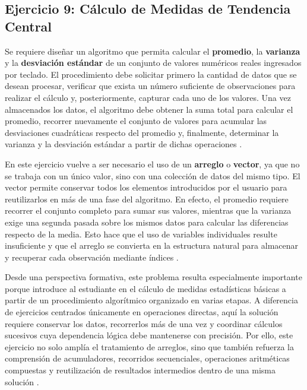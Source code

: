 \documentclass[12pt,twoside]{book}
\begin{document}
			\subsection{Ejercicio 9: Cálculo de Medidas de Tendencia Central}
			\noindent
				Se requiere diseñar un algoritmo que permita calcular el \textbf{promedio}, la \textbf{varianza} y la \textbf{desviación estándar} de un conjunto de valores numéricos reales ingresados por teclado. El procedimiento debe solicitar primero la cantidad de datos que se desean procesar, verificar que exista un número suficiente de observaciones para realizar el cálculo y, posteriormente, capturar cada uno de los valores. Una vez almacenados los datos, el algoritmo debe obtener la suma total para calcular el promedio, recorrer nuevamente el conjunto de valores para acumular las desviaciones cuadráticas respecto del promedio y, finalmente, determinar la varianza y la desviación estándar a partir de dichas operaciones \cite{Cormen2022Introduction,Sebesta2018Concepts,Gaddis2022Starting}.
				
				En este ejercicio vuelve a ser necesario el uso de un \textbf{arreglo} o \textbf{vector}, ya que no se trabaja con un único valor, sino con una colección de datos del mismo tipo. El vector permite conservar todos los elementos introducidos por el usuario para reutilizarlos en más de una fase del algoritmo. En efecto, el promedio requiere recorrer el conjunto completo para sumar sus valores, mientras que la varianza exige una segunda pasada sobre los mismos datos para calcular las diferencias respecto de la media. Esto hace que el uso de variables individuales resulte insuficiente y que el arreglo se convierta en la estructura natural para almacenar y recuperar cada observación mediante índices \cite{Sebesta2018Concepts,Gaddis2022Starting}.
				
				Desde una perspectiva formativa, este problema resulta especialmente importante porque introduce al estudiante en el cálculo de medidas estadísticas básicas a partir de un procedimiento algorítmico organizado en varias etapas. A diferencia de ejercicios centrados únicamente en operaciones directas, aquí la solución requiere conservar los datos, recorrerlos más de una vez y coordinar cálculos sucesivos cuya dependencia lógica debe mantenerse con precisión. Por ello, este ejercicio no solo amplía el tratamiento de arreglos, sino que también refuerza la comprensión de acumuladores, recorridos secuenciales, operaciones aritméticas compuestas y reutilización de resultados intermedios dentro de una misma solución \cite{Futschek2006Algorithmic,Qian2018Students,Robins2003Learning,Lister2004Learning}.
				
\end{document}
